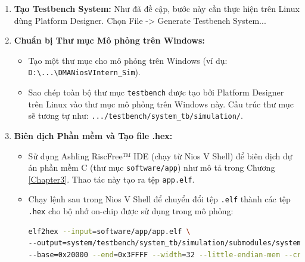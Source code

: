 \begin{enumerate}
    \item \textbf{Tạo Testbench System:} Như đã đề cập, bước này cần thực hiện trên Linux dùng Platform Designer. Chọn File -> Generate Testbench System...
    \item \textbf{Chuẩn bị Thư mục Mô phỏng trên Windows:}
        \begin{itemize}
            \item Tạo một thư mục cho mô phỏng trên Windows (ví dụ: \texttt{D:\textbackslash ...\textbackslash DMANiosVIntern\_Sim}).
            \item Sao chép toàn bộ thư mục \texttt{testbench} được tạo bởi Platform Designer trên Linux vào thư mục mô phỏng trên Windows này. Cấu trúc thư mục sẽ tương tự như: \texttt{.../testbench/system\_tb/simulation/}.
        \end{itemize}
    \item \textbf{Biên dịch Phần mềm và Tạo file .hex:}
        \begin{itemize}
            \item Sử dụng Ashling RiscFree™ IDE (chạy từ Nios V Shell) để biên dịch dự án phần mềm C (thư mục \texttt{software/app}) như mô tả trong Chương \ref{Chapter3}. Thao tác này tạo ra tệp \texttt{app.elf}.
            \item Chạy lệnh sau trong Nios V Shell để chuyển đổi tệp \texttt{.elf} thành các tệp \texttt{.hex} cho bộ nhớ on-chip được sử dụng trong mô phỏng:
            \begin{lstlisting}[language=bash, caption={Command to generate .hex file from .elf}]
elf2hex --input=software/app/app.elf \
--output=system/testbench/system_tb/simulation/submodules/system_onchip_memory2_0.hex \
--base=0x20000 --end=0x3FFFF --width=32 --little-endian-mem --create-lanes=0


\end{lstlisting}
\end{itemize}
\end{enumerate}
